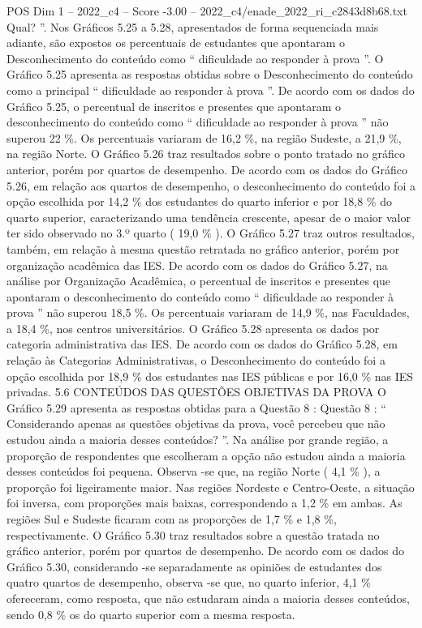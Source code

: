 \begin{textsample}{POS Dim 1 – 2022\_c4 – Score -3.00 – 2022\_c4/enade\_2022\_ri\_c2843d8b68.txt}
Qual? ”.
Nos Gráficos 5.25 a 5.28, apresentados de forma sequenciada mais adiante, são expostos os percentuais de estudantes que apontaram o Desconhecimento do conteúdo como “ dificuldade ao responder à prova ”.
O Gráfico 5.25 apresenta as respostas obtidas sobre o Desconhecimento do conteúdo como a principal “ dificuldade ao responder à prova ”.
De acordo com os dados do Gráfico 5.25, o percentual de inscritos e presentes que apontaram o desconhecimento do conteúdo como “ dificuldade ao responder à prova ” não superou 22 \%.
Os percentuais variaram de 16,2 \%, na região Sudeste, a 21,9 \%, na região Norte.
O Gráfico 5.26 traz resultados sobre o ponto tratado no gráfico anterior, porém por quartos de desempenho.
De acordo com os dados do Gráfico 5.26, em relação aos quartos de desempenho, o desconhecimento do conteúdo foi a opção escolhida por 14,2 \% dos estudantes do quarto inferior e por 18,8 \% do quarto superior, caracterizando uma tendência crescente, apesar de o maior valor ter sido observado no 3.º quarto ( 19,0 \% ).
O Gráfico 5.27 traz outros resultados, também, em relação à mesma questão retratada no gráfico anterior, porém por organização acadêmica das IES.
De acordo com os dados do Gráfico 5.27, na análise por Organização Acadêmica, o percentual de inscritos e presentes que apontaram o desconhecimento do conteúdo como “ dificuldade ao responder à prova ” não superou 18,5 \%.
Os percentuais variaram de 14,9 \%, nas Faculdades, a 18,4 \%, nos centros universitários.
O Gráfico 5.28 apresenta os dados por categoria administrativa das IES.
De acordo com os dados do Gráfico 5.28, em relação às Categorias Administrativas, o Desconhecimento do conteúdo foi a opção escolhida por 18,9 \% dos estudantes nas IES públicas e por 16,0 \% nas IES privadas. 5.6 CONTEÚDOS DAS QUESTÕES OBJETIVAS DA PROVA O Gráfico 5.29 apresenta as respostas obtidas para a Questão 8 : Questão 8 : “ Considerando apenas as questões objetivas da prova, você percebeu que não estudou ainda a maioria desses conteúdos? ”.
Na análise por grande região, a proporção de respondentes que escolheram a opção não estudou ainda a maioria desses conteúdos foi pequena.
Observa -se que, na região Norte ( 4,1 \% ), a proporção foi ligeiramente maior.
Nas regiões Nordeste e Centro-Oeste, a situação foi inversa, com proporções mais baixas, correspondendo a 1,2 \% em ambas.
As regiões Sul e Sudeste ficaram com as proporções de 1,7 \% e 1,8 \%, respectivamente.
O Gráfico 5.30 traz resultados sobre a questão tratada no gráfico anterior, porém por quartos de desempenho.
De acordo com os dados do Gráfico 5.30, considerando -se separadamente as opiniões de estudantes dos quatro quartos de desempenho, observa -se que, no quarto inferior, 4,1 \% ofereceram, como resposta, que não estudaram ainda a maioria desses conteúdos, sendo 0,8 \% os do quarto superior com a mesma resposta.

\end{textsample}
